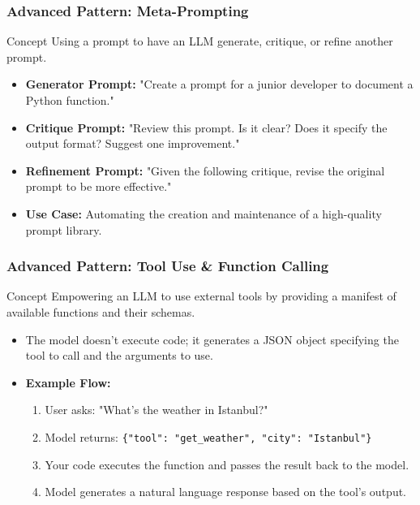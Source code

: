 \documentclass{beamer}
\begin{document}
\begin{frame}
    \frametitle{Advanced Pattern: Meta-Prompting}
    \begin{block}{Concept}
        Using a prompt to have an LLM generate, critique, or refine another prompt.
    \end{block}
    \begin{itemize}
        \item \textbf{Generator Prompt:} "Create a prompt for a junior developer to document a Python function."
        \item \textbf{Critique Prompt:} "Review this prompt. Is it clear? Does it specify the output format? Suggest one improvement."
        \item \textbf{Refinement Prompt:} "Given the following critique, revise the original prompt to be more effective."
        \item \textbf{Use Case:} Automating the creation and maintenance of a high-quality prompt library.
    \end{itemize}
\end{frame}

\begin{frame}
    \frametitle{Advanced Pattern: Tool Use \& Function Calling}
    \begin{block}{Concept}
        Empowering an LLM to use external tools by providing a manifest of available functions and their schemas.
    \end{block}
    \begin{itemize}
        \item The model doesn't execute code; it generates a JSON object specifying the tool to call and the arguments to use.
        \item \textbf{Example Flow:}
        \begin{enumerate}
            \item User asks: "What's the weather in Istanbul?"
            \item Model returns: \texttt{\{"tool": "get\_weather", "city": "Istanbul"\}}
            \item Your code executes the function and passes the result back to the model.
            \item Model generates a natural language response based on the tool's output.
        \end{enumerate}
    \end{itemize}
\end{frame}
\end{document}
